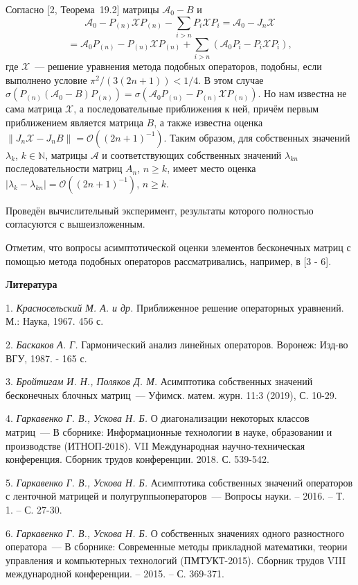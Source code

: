 Согласно [2, Теорема~19.2] матрицы $\mathcal{A}_0-B$ и
$$
\mathcal{A}_0 - P_{(n)}\mathcal{X}P_{(n)}-\sum_{i>n}P_i\mathcal{X}P_i=\mathcal{A}_0-J_n\mathcal{X}
$$
$$
= \mathcal{A}_0P_{(n)}-P_{(n)}\mathcal{X}P_{(n)}+\sum_{i>n}(\mathcal{A}_0P_i-P_i\mathcal{X}P_i),
$$
где $\mathcal{X}$~--- решение уравнения метода подобных
операторов, подобны, если выполнено условие $\pi^2/(3(2n+1))<1/4$. В этом случае $\sigma(P_{(n)}(\mathcal{A}_0-B)P_{(n)})=
\sigma(\mathcal{A}_0P_{(n)}-P_{(n)}\mathcal{X}P_{(n)})$. Но нам известна не сама
матрица $\mathcal{X}$, а последовательные приближения к ней, причём первым приближением является матрица $B$, а также известна
оценка $\|J_n\mathcal{X}-J_nB\|=\mathcal{O}((2n+1)^{-1})$. Таким образом, для собственных значений $\lambda_k$, $k\in\mathbb{N}$,
матрицы $\mathcal{A}$ и соответствующих собственных значений $\lambda_{kn}$ последовательности матриц $A_n$, $n\geqslant k$,
имеет место оценка $|\lambda_k-\lambda_{kn}|=\mathcal{O}((2n+1)^{-1})$, $n\geqslant k$.

Проведён вычислительный эксперимент, результаты которого полностью согласуются с вышеизложенным.

Отметим, что вопросы асимптотической оценки элементов бесконечных матриц с помощью метода подобных операторов рассматривались,
например, в [3 - 6].


\smallskip \centerline {\bf Литература} \nopagebreak

1. {\it Красносельский М. А. и др.} Приближенное решение операторных уравнений. М.: Наука, 1967. 456 с.

2. {\it Баскаков А. Г.} Гармонический анализ линейных операторов. Воронеж: Изд-во ВГУ, 1987. - 165 с.

3. {\it Бройтигам И. Н., Поляков Д. М.} Асимптотика собственных значений бесконечных блочных матриц~--- Уфимск. матем. журн. 11:3
(2019), С. 10-29.

4. {\it Гаркавенко Г. В., Ускова Н. Б.} О диагонализации некоторых классов матриц~--- В сборнике: Информационные технологии в науке, образовании и производстве (ИТНОП-2018). VII Международная научно-техническая конференция. Сборник трудов конференции. 2018. С. 539-542.

5. {\it Гаркавенко Г. В., Ускова Н. Б.} Асимптотика собственных значений операторов с ленточной матрицей и полугруппыоператоров~---
Вопросы науки. -- 2016. -- Т. 1. -- С. 27-30.

6. {\it Гаркавенко Г. В., Ускова Н. Б.}  О собственных значениях одного разностного оператора~---
В сборнике: Современные методы прикладной математики, теории управления и компьютерных технологий (ПМТУКТ-2015). Сборник трудов VIII международной конференции. -- 2015. -- С. 369-371.

